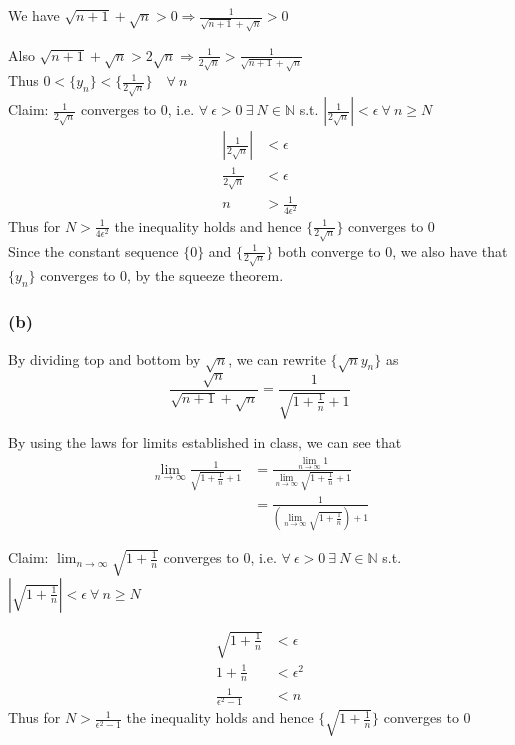 \documentclass{article}
\begin{document}
We have \(\sqrt{n+1} + \sqrt{n} > 0 \Rightarrow \frac{1}{\sqrt{n+1} + \sqrt{n}} > 0\)

Also \(\sqrt{n+1} + \sqrt{n} > 2\sqrt{n} \Rightarrow \frac{1}{2\sqrt{n}} > \frac{1}{\sqrt{n+1} + \sqrt{n}}\)
\\

Thus \(0 < \{y_n\} < \{\frac{1}{2\sqrt{n}}\} \quad \forall \ n\)
\\

Claim: \(\frac{1}{2\sqrt{n}}\) converges to \(0\), i.e. \(\forall \ \epsilon > 0 \ \exists \ N \in \mathbb{N}\) s.t. 
\(|\frac{1}{2\sqrt{n}}|< \epsilon \ \forall \ n \geq N\)
\begin{align*}
    \left|\frac{1}{2\sqrt{n}}\right| &< \epsilon 
    \\
    \frac{1}{2\sqrt{n}} &< \epsilon
    \\
    n &> \frac{1}{4\epsilon^2}
\end{align*}
Thus for \(N > \frac{1}{4\epsilon^2}\) the inequality holds and hence \(\{\frac{1}{2\sqrt{n}}\}\) converges to 0
\\

Since the constant sequence \(\{0\}\) and \(\{\frac{1}{2\sqrt{n}}\}\) both converge to 0, we also have that \(\{y_n\}\) 
converges to 0, by the squeeze theorem.

\subsubsection*{(b)}
By dividing top and bottom by \(\sqrt{n}\), we can rewrite \(\{\sqrt{n}y_n\}\) as 
\[
\frac{\sqrt{n}}{\sqrt{n+1} + \sqrt{n}} = \frac{1}{\sqrt{1+ \frac{1}{n}} + 1}
\]

By using the laws for limits established in class, we can see that
\begin{align*}
    \lim_{n\to\infty}{\frac{1}{\sqrt{1+ \frac{1}{n}} + 1}} &= \frac{\lim_{n\to\infty}{1}}{\lim_{n\to\infty}{\sqrt{1+ \frac{1}{n}} + 1}} \\
    &= \frac{1}{(\lim_{n\to\infty}{\sqrt{1+ \frac{1}{n}}}) + 1}
\end{align*}

Claim: \(\lim_{n\to\infty}{\sqrt{1+ \frac{1}{n}}}\) converges to \(0\), i.e. \(\forall \ \epsilon > 0 \ \exists \ N \in \mathbb{N}\) s.t. 
\(\left|\sqrt{1+ \frac{1}{n}}\right|< \epsilon \ \forall \ n \geq N\)

\begin{align*}
    \sqrt{1+ \frac{1}{n}} &< \epsilon
    \\
    1 + \frac{1}{n} &< \epsilon^2 
    \\
    \frac{1}{\epsilon^2 -1} &< n 
\end{align*}
Thus for \(N > \frac{1}{\epsilon^2 -1}\) the inequality holds and hence \(\{\sqrt{1+ \frac{1}{n}}\}\) converges to 0
\end{document}
